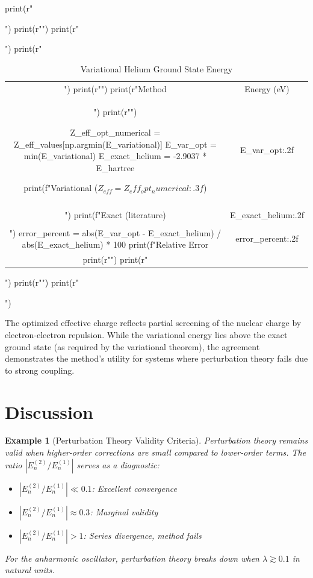 \documentclass[a4paper, 11pt]{article}
\newtheorem{example}{Example}[section]
\begin{document}
\begin{pycode}
print(r"\begin{table}[htbp]")
print(r"\centering")
print(r"\caption{Variational Helium Ground State Energy}")
print(r"\begin{tabular}{cc}")
print(r"\toprule")
print(r"Method & Energy (eV) \\")
print(r"\midrule")

Z_eff_opt_numerical = Z_eff_values[np.argmin(E_variational)]
E_var_opt = min(E_variational)
E_exact_helium = -2.9037 * E_hartree

print(f"Variational ($Z_{{eff}}={Z_eff_opt_numerical:.3f}$) & {E_var_opt:.2f} \\\\")
print(f"Exact (literature) & {E_exact_helium:.2f} \\\\")
error_percent = abs(E_var_opt - E_exact_helium) / abs(E_exact_helium) * 100
print(f"Relative Error & {error_percent:.2f}\\%

print(r"\bottomrule")
print(r"\end{tabular}")
print(r"\label{tab:variational}")
print(r"\end{table}")
\end{pycode}

The optimized effective charge  reflects
partial screening of the nuclear charge by electron-electron repulsion.
While the variational energy lies above the exact ground state (as required
by the variational theorem), the agreement demonstrates the method's utility
for systems where perturbation theory fails due to strong coupling.

\section{Discussion}

\begin{example}[Perturbation Theory Validity Criteria]
Perturbation theory remains valid when higher-order corrections are small
compared to lower-order terms. The ratio $|E_n^{(2)} / E_n^{(1)}|$ serves
as a diagnostic:
\begin{itemize}
\item $|E_n^{(2)} / E_n^{(1)}| \ll 0.1$: Excellent convergence
\item $|E_n^{(2)} / E_n^{(1)}| \approx 0.3$: Marginal validity
\item $|E_n^{(2)} / E_n^{(1)}| > 1$: Series divergence, method fails
\end{itemize}
For the anharmonic oscillator, perturbation theory breaks down when
$\lambda \gtrsim 0.1$ in natural units.
\end{example}
\end{document}
